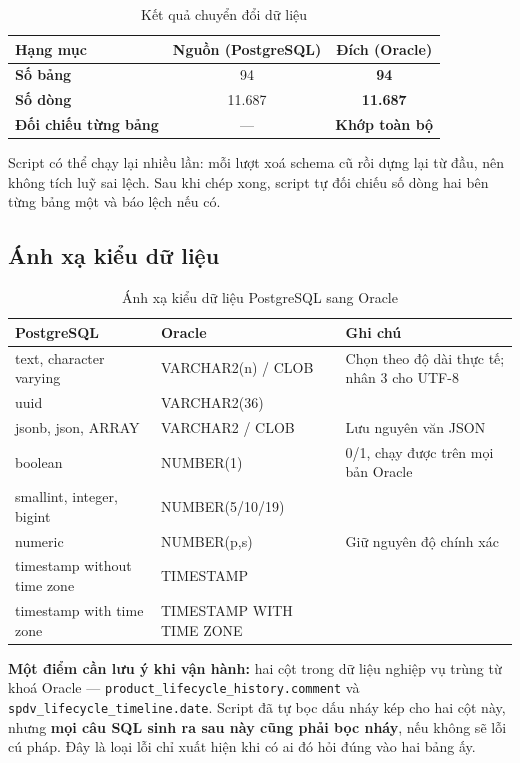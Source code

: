 \documentclass[12pt,a4paper]{article}
\newcommand{\ok}[1]{\textcolor{successgreen}{\bfseries #1}}
\begin{document}
\begin{table}[H]
\centering
\caption{Kết quả chuyển đổi dữ liệu}
\begin{tabularx}{\textwidth}{>{\bfseries}Xcc}
\toprule
\rowcolor{lightblue}
Hạng mục & Nguồn (PostgreSQL) & Đích (Oracle)\\
\midrule
Số bảng & 94 & \ok{94}\\
Số dòng & 11.687 & \ok{11.687}\\
Đối chiếu từng bảng & --- & \ok{Khớp toàn bộ}\\
\bottomrule
\end{tabularx}
\end{table}

Script có thể chạy lại nhiều lần: mỗi lượt xoá schema cũ rồi dựng lại từ đầu,
nên không tích luỹ sai lệch. Sau khi chép xong, script tự đối chiếu số dòng
hai bên từng bảng một và báo lệch nếu có.

\subsection{Ánh xạ kiểu dữ liệu}

\begin{table}[H]
\centering
\caption{Ánh xạ kiểu dữ liệu PostgreSQL sang Oracle}
\begin{tabularx}{\textwidth}{>{\ttfamily}L{5.2cm}>{\ttfamily}L{4.6cm}X}
\toprule
{}
\textrm{\bfseries PostgreSQL} & \textrm{\bfseries Oracle} & \textrm{\bfseries Ghi chú}\\
\midrule
text, character varying & VARCHAR2(n) / CLOB & Chọn theo độ dài thực tế; nhân 3 cho UTF-8\\
uuid & VARCHAR2(36) & \\
jsonb, json, ARRAY & VARCHAR2 / CLOB & Lưu nguyên văn JSON\\
boolean & NUMBER(1) & 0/1, chạy được trên mọi bản Oracle\\
smallint, integer, bigint & NUMBER(5/10/19) & \\
numeric & NUMBER(p,s) & Giữ nguyên độ chính xác\\
timestamp without time zone & TIMESTAMP & \\
timestamp with time zone & TIMESTAMP WITH TIME ZONE & \\
\bottomrule
\end{tabularx}
\end{table}

\textbf{Một điểm cần lưu ý khi vận hành:} hai cột trong dữ liệu nghiệp vụ trùng
từ khoá Oracle --- \texttt{product\_lifecycle\_history.comment} và
\texttt{spdv\_lifecycle\_timeline.date}. Script đã tự bọc dấu nháy kép cho hai
cột này, nhưng \textbf{mọi câu SQL sinh ra sau này cũng phải bọc nháy}, nếu
không sẽ lỗi cú pháp. Đây là loại lỗi chỉ xuất hiện khi có ai đó hỏi đúng vào
hai bảng ấy.
\end{document}
